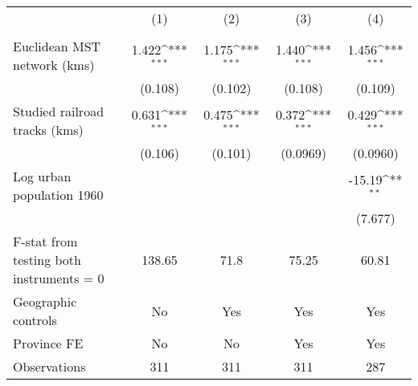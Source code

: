 {
\def\sym#1{\ifmmode^{#1}\else\(^{#1}\)\fi}
\begin{tabular}{l*{4}{c}}
\hline\hline
                &\multicolumn{1}{c}{(1)}&\multicolumn{1}{c}{(2)}&\multicolumn{1}{c}{(3)}&\multicolumn{1}{c}{(4)}\\
                &\multicolumn{1}{c}{}&\multicolumn{1}{c}{}&\multicolumn{1}{c}{}&\multicolumn{1}{c}{}\\
\hline
Euclidean MST network (kms)&    1.422\sym{***}&    1.175\sym{***}&    1.440\sym{***}&    1.456\sym{***}\\
                &  (0.108)         &  (0.102)         &  (0.108)         &  (0.109)         \\
[1em]
Studied railroad tracks (kms)&    0.631\sym{***}&    0.475\sym{***}&    0.372\sym{***}&    0.429\sym{***}\\
                &  (0.106)         &  (0.101)         & (0.0969)         & (0.0960)         \\
[1em]
Log urban population 1960&                  &                  &                  &   -15.19\sym{**} \\
                &                  &                  &                  &  (7.677)         \\
\hline
F-stat from testing both instruments = 0&   138.65         &     71.8         &    75.25         &    60.81         \\
Geographic controls&       No         &      Yes         &      Yes         &      Yes         \\
Province FE     &       No         &       No         &      Yes         &      Yes         \\
Observations    &      311         &      311         &      311         &      287         \\
\hline\hline
\end{tabular}
}
